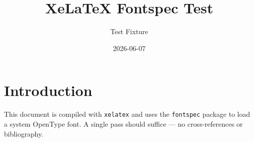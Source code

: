 \documentclass{article}
\title{XeLaTeX Fontspec Test}
\author{Test Fixture}
\date{2026-06-07}
\begin{document}
\maketitle

\section{Introduction}
This document is compiled with \texttt{xelatex} and uses the
\texttt{fontspec} package to load a system OpenType font.
A single pass should suffice --- no cross-references or bibliography.
\end{document}
